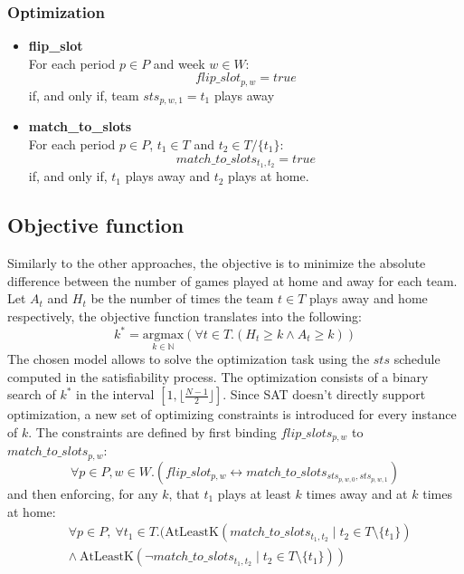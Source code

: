 \subsubsection{Optimization}
\begin{itemize}
    \item \textbf{flip\_slot}\\
        For each period $p \in P$ and week $w \in W$:
        $$
        flip\_slot_{p, w} = true
        $$
        if, and only if, team $sts_{p, w, 1} = t_1$ plays away
    \item \textbf{match\_to\_slots}\\
        For each period $p \in P$, $t_1 \in T$ and $t_2 \in T/\{t_1\}$:
        $$
        match\_to\_slots_{t_1, t_2} = true
        $$
        if, and only if, $t_1$ plays away and $t_2$ plays at home.
\end{itemize}

\subsection{Objective function}
Similarly to the other approaches, the objective is to minimize the absolute difference between the number of games played at home and away for each team.
Let $A_t$ and $H_t$ be the number of times the team $t \in T$ plays away and home respectively, the objective function translates into the following:
$$
k^* = \underset{k \in \mathbb{N}}{\text{argmax}} \left( \forall t \in T. (H_t \geq k \land A_t \geq k) \right)
$$
The chosen model allows to solve the optimization task using the $sts$ schedule computed in the satisfiability process. The optimization consists of a binary search of $k^*$ in the interval $[1, \lfloor\frac{N-1}{2}\rfloor]$. Since SAT doesn't directly support optimization, a new set of optimizing constraints is introduced for every instance of $k$. The constraints are defined by first binding $flip\_slots_{p, w}$ to $match\_to\_slots_{p, w}$:
$$
    \forall p \in P, w \in W.(flip\_slot_{p, w} \leftrightarrow match\_to\_slots_{sts_{p, w, 0}, sts_{p, w, 1}})
$$
and then enforcing, for any $k$, that $t_1$ plays at least $k$ times away and at $k$ times at home:
$$
\begin{aligned}
    &\forall p \in P,\ \forall t_1 \in T.( \text{AtLeastK}(match\_to\_slots_{t_1,t_2} \mid t_2 \in T \setminus \{t_1\})\\
    &\left. \land\ 
    \text{AtLeastK}(\lnot match\_to\_slots_{t_1,t_2} \mid t_2 \in T \setminus \{t_1\}) \right)
\end{aligned}
$$

